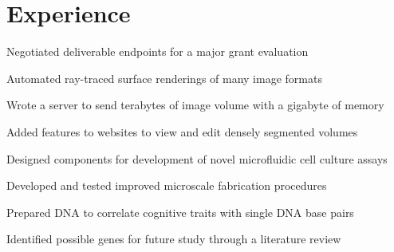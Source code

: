 \documentclass[]{deedy-resume-openfont}
\begin{document}
\begin{minipage}[t]{0.66\textwidth} 


\section{Experience}

\vspace{\topsep}
\begin{tightemize}
\item Negotiated deliverable endpoints for a major grant evaluation
\item Automated ray-traced surface renderings of many image formats
\item Wrote a server to send terabytes of image volume with a gigabyte of memory
\item Added features to websites to view and edit densely segmented volumes
\end{tightemize}
\sectionsep

\begin{tightemize}
\item Designed components for development of novel microfluidic cell culture assays
\item Developed and tested improved microscale fabrication procedures
\end{tightemize}
\sectionsep

\begin{tightemize}
\item Prepared DNA to correlate cognitive traits with single DNA base pairs
\item Identified possible genes for future study through a literature review
\end{tightemize}
\sectionsep



\end{minipage}
\end{document}

